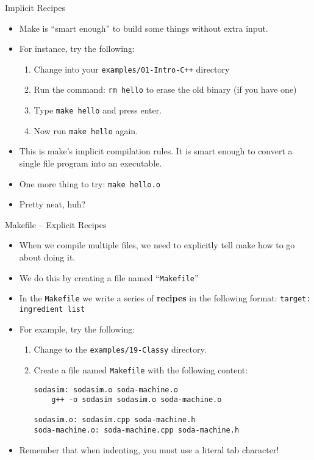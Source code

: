 \documentclass[]{beamer}
\begin{document}
\begin{frame}{Implicit Recipes}
\begin{itemize}[<+->]
    \item Make is ``smart enough'' to build some things without extra
        input.
    \item For instance, try the following:
    \begin{enumerate}
        \item Change into your \texttt{examples/01-Intro-C++}
            directory
        \item Run the command: \texttt{rm hello} to erase the old
            binary (if you have one)
        \item Type \texttt{make hello} and press enter.
        \item Now run \texttt{make hello} again.
    \end{enumerate}
    \item This is make's implicit compilation rules.  It is smart
        enough to convert a single file program into an executable.
    \item One more thing to try:
        \newline\texttt{make hello.o}
    \item Pretty neat, huh?
\end{itemize}
\end{frame}


\begin{frame}[fragile]{Makefile -- Explicit Recipes}
\begin{itemize}[<+->]
    \item When we compile multiple files, we need to explicitly tell
        make how to go about doing it.
    \item We do this by creating a file named ``\texttt{Makefile}''
    \item In the \texttt{Makefile} we write a series of
        \textbf{recipes} in the following format:
        \newline\texttt{target: ingredient list}
    \item For example, try the following:
    \begin{enumerate}
        \item Change to the \texttt{examples/19-Classy} directory.
        \item Create a file named \texttt{Makefile} with the following
        content:
\begin{adjustbox}{max width=\textwidth, max totalheight=0.9\textheight}
\begin{BVerbatim}
sodasim: sodasim.o soda-machine.o
    g++ -o sodasim sodasim.o soda-machine.o

sodasim.o: sodasim.cpp soda-machine.h
soda-machine.o: soda-machine.cpp soda-machine.h
\end{BVerbatim}
\end{adjustbox}
    \end{enumerate}
    \item Remember that when indenting, you must use a literal tab
        character!
\end{itemize}
\end{frame}
\end{document}
